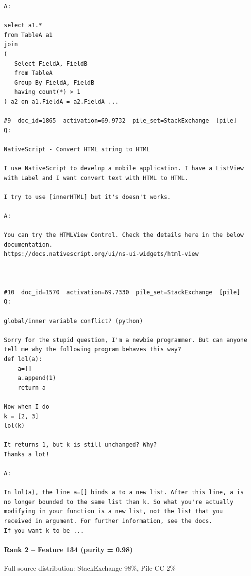 \begin{verbatim}
A:

select a1.* 
from TableA a1
join
(
   Select FieldA, FieldB
   from TableA 
   Group By FieldA, FieldB 
   having count(*) > 1
) a2 on a1.FieldA = a2.FieldA ...

#9  doc_id=1865  activation=69.9732  pile_set=StackExchange  [pile]
Q:

NativeScript - Convert HTML string to HTML

I use NativeScript to develop a mobile application. I have a ListView with Label and I want convert text with HTML to HTML.

I try to use [innerHTML] but it's doesn't works.

A:

You can try the HTMLView Control. Check the details here in the below documentation.
https://docs.nativescript.org/ui/ns-ui-widgets/html-view



#10  doc_id=1570  activation=69.7330  pile_set=StackExchange  [pile]
Q:

global/inner variable conflict? (python)

Sorry for the stupid question, I'm a newbie programmer. But can anyone tell me why the following program behaves this way?
def lol(a):
    a=[]
    a.append(1)
    return a

Now when I do 
k = [2, 3]
lol(k)

It returns 1, but k is still unchanged? Why?
Thanks a lot!

A:

In lol(a), the line a=[] binds a to a new list. After this line, a is no longer bounded to the same list than k. So what you're actually modifying in your function is a new list, not the list that you received in argument. For further information, see the docs.
If you want k to be ...

\end{verbatim}

\paragraph*{Rank 2 -- Feature 134 (purity = 0.98)}

Full source distribution: StackExchange 98\%, Pile-CC 2\%

